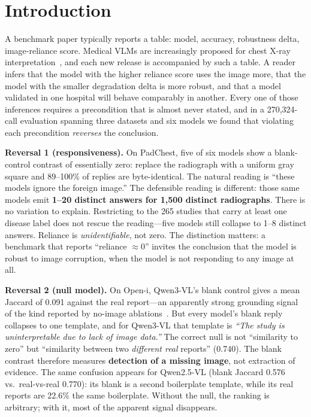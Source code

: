 \section{Introduction}
\label{sec:intro}

A benchmark paper typically reports a table: model, accuracy, robustness delta, image-reliance score. Medical VLMs are increasingly proposed for chest X-ray interpretation~\citep{chen2024chexagent,sellergren2025medgemma,bai2025qwen25vl}, and each new release is accompanied by such a table. A reader infers that the model with the higher reliance score uses the image more, that the model with the smaller degradation delta is more robust, and that a model validated in one hospital will behave comparably in another. Every one of those inferences requires a precondition that is almost never stated, and in a 270,324-call evaluation spanning three datasets and six models we found that violating each precondition \emph{reverses} the conclusion.

\textbf{Reversal 1 (responsiveness).} On PadChest, five of six models show a blank-control contrast of essentially zero: replace the radiograph with a uniform gray square and 89--100\% of replies are byte-identical. The natural reading is ``these models ignore the foreign image.'' The defensible reading is different: those same models emit \textbf{1--20 distinct answers for 1,500 distinct radiographs}. There is no variation to explain. Restricting to the 265 studies that carry at least one disease label does not rescue the reading---five models still collapse to 1--8 distinct answers. Reliance is \emph{unidentifiable}, not zero. The distinction matters: a benchmark that reports ``reliance $\approx 0$'' invites the conclusion that the model is robust to image corruption, when the model is not responding to any image at all.

\textbf{Reversal 2 (null model).} On Open-i, Qwen3-VL's blank control gives a mean Jaccard of 0.091 against the real report---an apparently strong grounding signal of the kind reported by no-image ablations~\citep{hong2026see,singla2026guess}. But every model's blank reply collapses to one template, and for Qwen3-VL that template is \emph{``The study is uninterpretable due to lack of image data.''} The correct null is not ``similarity to zero'' but ``similarity between two \emph{different real} reports'' (0.740). The blank contrast therefore measures \textbf{detection of a missing image}, not extraction of evidence. The same confusion appears for Qwen2.5-VL (blank Jaccard 0.576 vs.\ real-vs-real 0.770): its blank is a second boilerplate template, while its real reports are 22.6\% the same boilerplate. Without the null, the ranking is arbitrary; with it, most of the apparent signal disappears.

